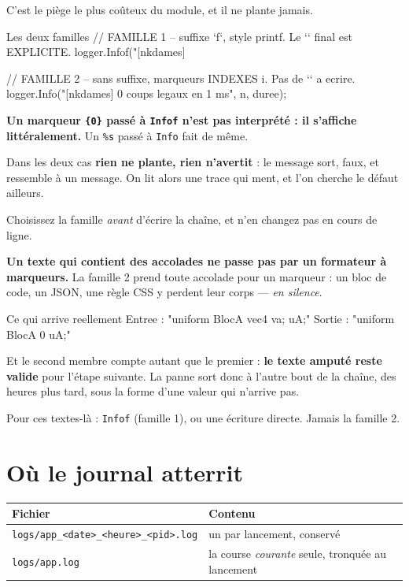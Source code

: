 C'est le piège le plus coûteux du module, et il ne plante jamais.

\begin{nkcode}{Les deux familles}
// FAMILLE 1 -- suffixe `f`, style printf. Le `\n` final est EXPLICITE.
logger.Infof("[nkdames] %

// FAMILLE 2 -- sans suffixe, marqueurs INDEXES {i}. Pas de `\n` a ecrire.
logger.Info("[nkdames] {0} coups legaux en {1} ms", n, duree);
\end{nkcode}

\begin{nkpiege}
\textbf{Un marqueur \texttt{\{0\}} passé à \texttt{Infof} n'est pas interprété :
il s'affiche littéralement.} Un \texttt{\%s} passé à \texttt{Info} fait de même.

Dans les deux cas \textbf{rien ne plante, rien n'avertit} : le message sort,
faux, et ressemble à un message. On lit alors une trace qui ment, et l'on cherche
le défaut ailleurs.

Choisissez la famille \emph{avant} d'écrire la chaîne, et n'en changez pas en
cours de ligne.
\end{nkpiege}

\begin{nkpiege}
\textbf{Un texte qui contient des accolades ne passe pas par un formateur à
marqueurs.} La famille 2 prend toute accolade pour un marqueur : un bloc de code,
un JSON, une règle CSS y perdent leur corps --- \emph{en silence}.

\begin{nkcode}{Ce qui arrive reellement}
Entree : "uniform BlocA {\n    vec4 va;\n} uA;"
Sortie : "uniform BlocA 0 uA;"
\end{nkcode}

Et le second membre compte autant que le premier : \textbf{le texte amputé reste
valide} pour l'étape suivante. La panne sort donc à l'autre bout de la chaîne,
des heures plus tard, sous la forme d'une valeur qui n'arrive pas.

Pour ces textes-là : \texttt{Infof} (famille 1), ou une écriture directe. Jamais
la famille 2.
\end{nkpiege}

\section{Où le journal atterrit}

\begin{center}
\begin{tabular}{@{}ll@{}}
\toprule
\textbf{Fichier} & \textbf{Contenu} \\
\midrule
\texttt{logs/app\_<date>\_<heure>\_<pid>.log} & un par lancement, conservé \\
\texttt{logs/app.log} & la course \emph{courante} seule, tronquée au lancement \\
\bottomrule
\end{tabular}
\end{center}

